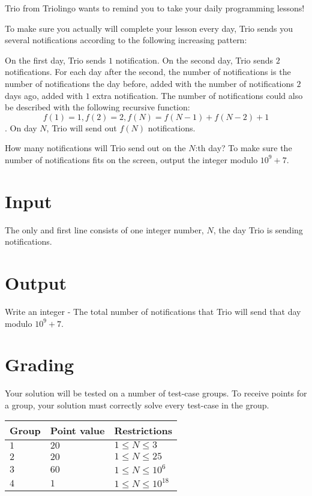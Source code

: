 \noindent
Trio from Triolingo wants to remind you to take your daily programming lessons!

\noindent
To make sure you actually will complete your lesson every day, Trio sends you several notifications according to the following increasing pattern:

\noindent
On the first day, Trio sends $1$ notification.
On the second day, Trio sends $2$ notifications.
For each day after the second, the number of notifications is the number of notifications the day before, added with the number of notifications $2$ days ago, added with $1$ extra notification.
The number of notifications could also be described with the following recursive function:
$$f(1)=1,f(2)=2,f(N)=f(N-1)+f(N-2)+1$$. On day $N$, Trio will send out $f(N)$ notifications.

\noindent
How many notifications will Trio send out on the $N$:th day? To make sure the number of notifications fits on the screen, output the integer modulo $10^9+7$.


\section*{Input}
\noindent
The only and first line consists of one integer number, $N$, the day Trio is sending notifications.

\section*{Output}
\noindent
Write an integer - The total number of notifications that Trio will send that day modulo $10^9+7$.

\section*{Grading}
\noindent
Your solution will be tested on a number of test-case groups.
\noindent
To receive points for a group, your solution must correctly solve every test-case in the group.

\noindent
\begin{tabular}{| l | l | l |}
\hline
  Group & Point value & Restrictions \\ \hline
  $1$    & $20$       &  $1 \leq N \leq 3$ \\ \hline
  $2$    & $20$       &  $1 \leq N \leq 25$ \\ \hline
  $3$    & $60$       &  $1 \leq N \leq 10^6$ \\ \hline
  $4$    & $1$        &  $1 \leq N \leq 10^{18}$ \\ \hline
\end{tabular}
